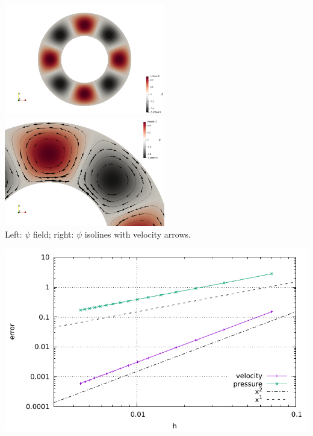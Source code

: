 \begin{center}
\includegraphics[width=7cm]{python_codes/fieldstone_09/RESULTS/psi}
\includegraphics[width=7cm]{python_codes/fieldstone_09/RESULTS/psi_arrows}\\
{\captionfont Left: $\psi$ field; right: $\psi$ isolines with velocity arrows.}
\end{center}

\begin{center}
\includegraphics[width=15cm]{python_codes/fieldstone_09/RESULTS/errors}
\end{center}



